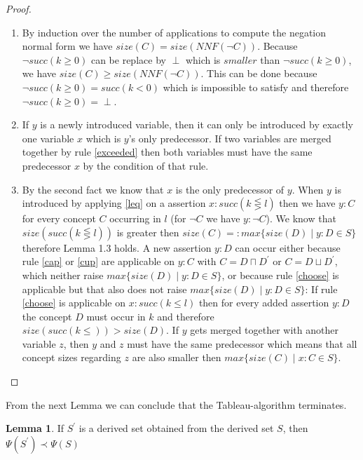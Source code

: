 \documentclass[a4paper,11pt]{scrartcl}
\theoremstyle{break}
\theoremstyle{definition}
\newtheorem{mylem}{Lemma}
\begin{document}
\begin{proof}$ $\\
\vspace*{-5mm}
\begin{enumerate}
\item By induction over the number of applications to compute the negation normal form we have $size(C)=size(NNF(\neg C))$. Because $\neg succ(k\geq0)$ can be replace by $\perp$ which is $smaller$ than $\neg succ(k\geq 0)$, we have $size(C)\geq size(NNF(\neg C))$. This can be done because $\neg succ(k\geq 0)= succ(k<0)$ which is impossible to satisfy and therefore $\neg succ(k\geq 0)=\perp$.
\item If $y$ is a newly introduced variable, then it can only be introduced by exactly one variable $x$ which is $y$'s only predecessor. If two variables are merged together by rule \ref{exceeded} then both variables must have the same predecessor $x$ by the condition of that rule.
\item By the second fact we know that $x$ is the only predecessor of $y$. When $y$ is introduced by applying \ref{leq} on a assertion $x:succ(k\lesseqgtr l)$ then we have $y:C$ for every concept $C$ occurring in $l$ (for $\neg C$ we have $y:\neg C$). We know that $size(succ(k\lesseqgtr l))$ is greater then $size(C)=:max\{size(D)\mid y:D\in S\}$ therefore Lemma 1.3 holds. A new assertion $y:D$ can occur either because rule \ref{cap} or \ref{cup} are applicable on $y:C$ with $C=D\sqcap D^\prime$ or $C=D\sqcup D^\prime$, which neither raise $max\{size(D)\mid y:D \in S\}$, or because rule \ref{choose} is applicable but that also does not raise $max\{size(D)\mid y:D \in S\}$: If rule \ref{choose} is applicable on $x:succ(k\leq l)$ then for every added assertion $y:D$ the concept $D$ must occur in $k$ and therefore $size(succ(k\leq))>size(D)$. If $y$ gets merged together with another variable $z$, then $y$ and $z$ must have the same predecessor which means that all concept sizes regarding $z$ are also smaller then $max\{size(C)\mid x:C\in S\}$. 
\end{enumerate}
\end{proof}
From the next Lemma we can conclude that the Tableau-algorithm terminates.
\begin{mylem}
If $S^\prime$ is a derived set obtained from the derived set $S$, then $\Psi(S^\prime)\prec\Psi(S)$
\end{mylem}
\end{document}
